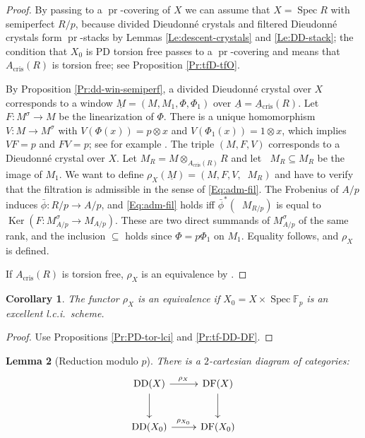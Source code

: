 \documentclass[a4paper,11pt]{article}
\theoremstyle{plain}
\newtheorem{Lemma}{Lemma}
\newtheorem{Cor}[Lemma]{Corollary}
\theoremstyle{definition}
\theoremstyle{remark}
\theoremstyle{definition}
\numberwithin{Lemma}{section}
\numberwithin{Subpoint}{Lemma}
\numberwithin{equation}{section}
\newcommand{\FF}{{\mathbb{F}}}
\DeclareMathOperator{\DDcat}{DD}
\DeclareMathOperator{\DFcat}{DF}
\DeclareMathOperator{\Filone}{Fil^1}
\DeclareMathOperator{\Ker}{Ker}
\DeclareMathOperator{\Spec}{Spec}
\DeclareMathOperator{\cris}{cris}
\newcommand{\nameoftop}{{\operatorname{pr}}}
\renewcommand{\u}{\underline}
\begin{document}
\begin{proof}
By passing to a $\nameoftop$-covering of $X$
we can assume that $X=\Spec R$ with semiperfect $R/p$,
because divided Dieudonn\'e crystals and filtered Dieu\-donn\'e crystals 
form $\nameoftop$-stacks by Lemmas \ref{Le:descent-crystals}
and \ref{Le:DD-stack}; 
the condition that $X_0$ is PD torsion free passes
to a $\nameoftop$-covering and
means that $A_{\cris}(R)$ is torsion free;
see Proposition \ref{Pr:tfD-tfO}.

By Proposition \ref{Pr:dd-win-semiperf},
a divided Dieudonn\'e crystal over $X$ corresponds to a window
$\u M=(M,M_1,\Phi,\Phi_1)$ over $\u A=\u A{}_{\cris}(R)$.
Let $F:M^\sigma\to M$ be the linearization of $\Phi$.
There is a unique homomorphism $V:M\to M^\sigma$ with 
$V(\Phi(x))=p\otimes x$ and $V(\Phi_1(x))=1\otimes x$,
which implies $VF=p$ and $FV=p$;
see for example \cite[Remark 2.1.4]{Cais-Lau}.
The triple $(M,F,V)$ corresponds to a Dieudonn\'e crystal over $X$.
Let $M_R=M\otimes_{A_{\cris}(R)}R$ and let $\Filone M_R\subseteq M_R$
be the image of $M_1$. 
We want to define $\rho_X(\u M)=(M,F,V,\Filone M_R)$ 
and have to verify that the filtration is admissible
in the sense of \eqref{Eq:adm-fil}.
The Frobenius of $A/p$ induces $\bar\phi:R/p\to A/p$,
and \eqref{Eq:adm-fil} holds iff 
$\bar\phi^*(\Filone M_{R/p})$ is equal to 
$\Ker(F:M^{\sigma}_{A/p}\to M_{A/p})$.
These are two direct summands of $M^{\sigma}_{A/p}$ of the same rank, 
and the inclusion $\subseteq$ holds since $\Phi=p\Phi_1$ on $M_1$.
Equality follows, and $\rho_X$ is defined.

If $A_{\cris}(R)$ is torsion free,
$\rho_X$ is an equivalence by 
\cite[Prop.~2.6.4]{Cais-Lau}.
\end{proof}

\begin{Cor}
\label{Co:DD-DF}
The functor $\rho_X$ is an equivalence if
$X_0=X\times\Spec\FF_p$ is an excellent l.c.i.\ scheme.
\end{Cor}

\begin{proof}
Use Propositions \ref{Pr:PD-tor-lci} and \ref{Pr:tf-DD-DF}.
\end{proof}

\begin{Lemma}[Reduction modulo $p$]
\label{Le:red-DD-DDF}
There is a $2$-cartesian diagram of categories:
\[
\xymatrix@M+0.2em{
\DDcat(X) \ar[r]^{\rho_X} \ar[d] &
\DFcat(X) \ar[d] \\
\DDcat(X_0) \ar[r]^{\rho_{X_0}} &
\DFcat(X_0)
}
\]
\end{Lemma}
\end{document}
